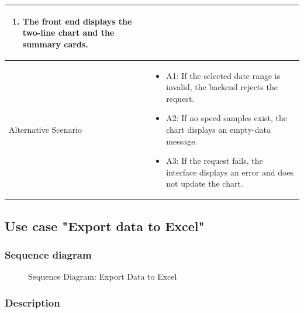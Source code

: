 {\begin{longtable}{|p{}|p{}|}
\begin{enumerate}
\item The front end displays the two-line chart and the summary cards.
\end{enumerate} \\ \hline
Alternative Scenario &
\begin{itemize}
\item A1: If the selected date range is invalid, the backend rejects the request.
\item A2: If no speed samples exist, the chart displays an empty-data message.
\item A3: If the request fails, the interface displays an error and does not update the chart.
\end{itemize} \\ \hline
\end{longtable}
}

\subsection{Use case "Export data to Excel"}

\subsubsection{Sequence diagram}

\begin{figure}[H]
\centering
{}
\caption{Sequence Diagram: Export Data to Excel}
\label{fig:chapter2-export-data-to-excel}
\end{figure}

\subsubsection{Description}

